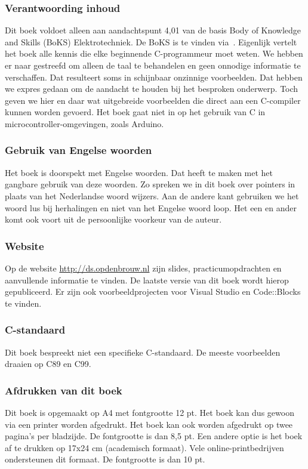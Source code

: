 \subsubsection*{Verantwoording inhoud}
Dit boek voldoet alleen aan aandachtspunt 4,01 van de basis Body of Knowledge and Skills (BoKS) Elektrotechniek. De
BoKS is te vinden via~\cite{hboengineering2016boks}. Eigenlijk vertelt het boek alle kennis die elke beginnende C-programmeur moet weten. We hebben er naar gestreefd om alleen de taal te behandelen en geen onnodige informatie te verschaffen. Dat resulteert soms in schijnbaar onzinnige voorbeelden. Dat hebben we expres gedaan om de aandacht te houden bij het besproken onderwerp. Toch geven we hier en daar wat uitgebreide voorbeelden die direct aan een C-compiler kunnen worden gevoerd. Het boek gaat niet in op het gebruik van C in microcontroller-omgevingen, zoals Arduino.

\subsubsection*{Gebruik van Engelse woorden}
Het boek is doorspekt met Engelse woorden. Dat heeft te maken met het gangbare gebruik van deze woorden. Zo spreken we in dit boek over pointers in plaats van het Nederlandse woord wijzers. Aan de andere kant gebruiken we het woord lus bij herhalingen en niet van het Engelse woord loop. Het een en ander komt ook voort uit de persoonlijke voorkeur van de auteur.

\subsubsection*{Website}
Op de website \url{http://ds.opdenbrouw.nl} zijn slides, practicumopdrachten en aanvullende informatie te vinden. De laatste versie van dit boek wordt hierop gepubliceerd. Er zijn ook voorbeeldprojecten voor Visual Studio en Code::Blocks te vinden.

\subsubsection*{C-standaard}
Dit boek bespreekt niet een specifieke C-standaard. De meeste voorbeelden draaien op C89 en C99.

\subsubsection*{Afdrukken van dit boek}
Dit boek is opgemaakt op A4 met fontgrootte 12 pt. Het boek kan dus gewoon via een printer worden afgedrukt. Het boek kan ook worden afgedrukt op twee pagina's per bladzijde. De fontgrootte is dan 8,5 pt. Een andere optie is het boek af te drukken op 17x24 cm (academisch formaat). Vele online-printbedrijven ondersteunen dit formaat. De fontgrootte is dan 10 pt.

